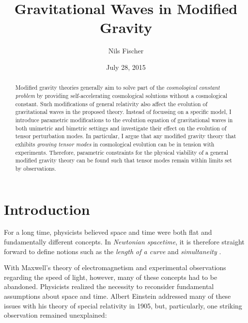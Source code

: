 \documentclass[12pt,parskip=half]{scrreprt}
\title{Gravitational Waves in Modified Gravity}
\author{Nils Fischer}
\date{July 28, 2015}
\begin{document}


\begin{abstract}
	Modified gravity theories generally aim to solve part of the \emph{cosmological constant problem} by providing self-accelerating cosmological solutions without a cosmological constant. Such modifications of general relativity also affect the evolution of gravitational waves in the proposed theory. Instead of focussing on a specific model, I introduce parametric modifications to the evolution equation of gravitational waves in both unimetric and bimetric settings and investigate their effect on the evolution of tensor perturbation modes. In particular, I argue that any modified gravity theory that exhibits \emph{growing tensor modes} in cosmological evolution can be in tension with experiments. Therefore, parametric constraints for the physical viability of a general modified gravity theory can be found such that tensor modes remain within limits set by observations.
\end{abstract}


\tableofcontents


\chapter{Introduction}\label{ch:intro}

For a long time, physicists believed space and time were both flat and fundamentally different concepts. In \emph{Newtonian spacetime}, it is therefore straight forward to define notions such as the \emph{length of a curve} and \emph{simultaneity} \citep{Tolish}.

With Maxwell's theory of electromagnetism and experimental observations regarding the speed of light, however, many of these concepts had to be abandoned. Physicists realized the necessity to reconsider fundamental assumptions about space and time. Albert Einstein addressed many of these issues with his theory of special relativity  in 1905, but, particularly, one striking observation remained unexplained:
\end{document}

